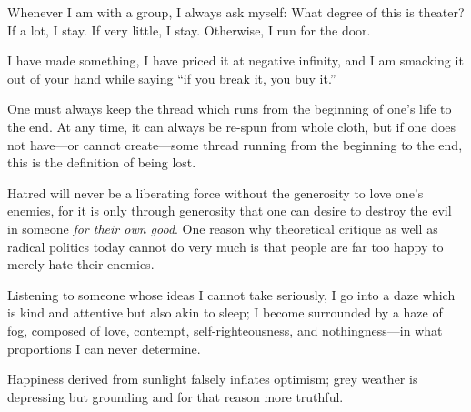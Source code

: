\documentclass[12pt, twocolumn, oneside]{article}  	%
\begin{document}
\vspace{3em}

Whenever I am with a group, I always ask myself: What degree of this is theater? If a lot, I stay. If very little, I stay. Otherwise, I run for the door.

\newpage


I have made something, I have priced it at negative infinity, and I am smacking it out of your hand while saying ``if you break it, you buy it.''

\vspace{3em}

One must always keep the thread which runs from the beginning of one's life to the end. At any time, it can always be re-spun from whole cloth, but if one does not have---or cannot create---some thread running from the beginning to the end, this is the definition of being lost.

\vspace{3em}

Hatred will never be a liberating force without the generosity to love one's enemies, for it is only through generosity that one can desire to destroy the evil in someone \emph{for their own good}. One reason why theoretical critique as well as radical politics today cannot do very much is that people are far too happy to merely hate their enemies.

\vspace{3em}

Listening to someone whose ideas I cannot take seriously, I go into a daze which is kind and attentive but also akin to sleep; I become surrounded by a haze of fog, composed of love, contempt, self-righteousness, and nothingness---in what proportions I can never determine.

\vspace{3em}

Happiness derived from sunlight falsely inflates optimism; grey weather is depressing but grounding and for that reason more truthful.

\newpage

\setcounter{page}{6}
\renewcommand{\thepage}{\arabic{page}}
\end{document}
